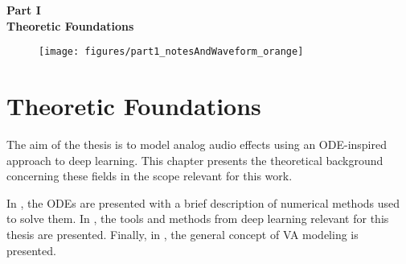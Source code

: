 \cleardoublepage
\thispagestyle{empty}
\begin{center}
\vspace*{3cm}
{\huge \bf Part I}\\ \vspace*{1cm}
{\Huge \bf Theoretic Foundations}\\\vspace*{0.2cm}
\begin{figure}[ht]
\centering
\texttt{[image: figures/part1\_notesAndWaveform\_orange]}
\end{figure}
\end{center}
\label{par:part1}
\newpage
\quad
\thispagestyle{empty}
\newpage



\chapter{Theoretic Foundations}
\label{chapter:Foundations}

The aim of the thesis is to model analog audio effects using an \ac{ODE}-inspired approach to deep learning. This chapter presents the theoretical background concerning these fields in the scope relevant for this work. 

In , the \acp{ODE} are presented with a brief description of numerical methods used to solve them. In , the tools and methods from deep learning relevant for this thesis are presented. Finally, in , the general concept of \ac{VA} modeling is presented.




